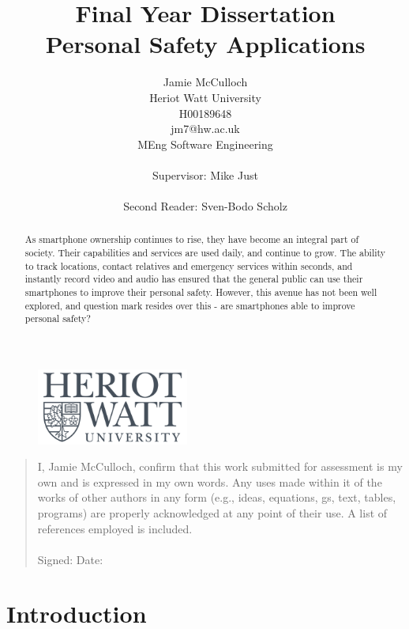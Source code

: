 \documentclass[a4paper]{report}
\begin{document}
\title{
{Final Year Dissertation}\\ {Personal Safety Applications\\}}
\author{Jamie McCulloch\\Heriot Watt University\\H00189648\\jm7@hw.ac.uk\\MEng Software Engineering\\\\Supervisor: Mike Just\\\\Second Reader: Sven-Bodo Scholz}
\begin{figure}
\includegraphics[width=50mm, scale = 0.5]{logo.png}
\centering
\end{figure}
\date{}
\maketitle
\thispagestyle{empty}
\newpage
\begin{quote}
I, Jamie McCulloch, confirm that this work submitted for assessment is my own and is expressed in my own words. Any uses made within it of the works of other
authors in any form (e.g., ideas, equations, gs, text, tables, programs) are properly acknowledged at any point of their use. A list of references
employed is included.
\\ \\
Signed: 
Date: 
\thispagestyle{empty}
\end{quote}
\newpage
\begin{abstract}
As smartphone ownership continues to rise, they have become an integral part of society. Their capabilities and services are used daily, and continue to grow. The ability to track locations, contact relatives and emergency services within seconds, and instantly record video and audio has ensured that the general public can use their smartphones to improve their personal safety. However, this avenue has not been well explored, and question mark resides over this - are smartphones able to improve personal safety? 
\thispagestyle{empty}
\end{abstract}
\newpage
\tableofcontents
\thispagestyle{empty}
\newpage
\clearpage
\chapter{Introduction}
\label{sec:Intro}
\end{document}
